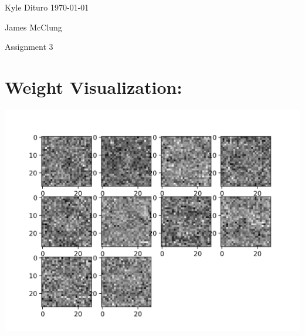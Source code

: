 \documentclass[12pt, letterpaper, notitlepage, twoside]{article}
\theoremstyle{definition}
\theoremstyle{plain}
\begin{document}
Kyle Dituro \hfill \today

James McClung
\begin{center}
{\huge Assignment 3}
\end{center}

\section{Weight Visualization:}
\begin{center}
    \includegraphics{Imgs/Wgray.png}
\end{center}
\end{document}

